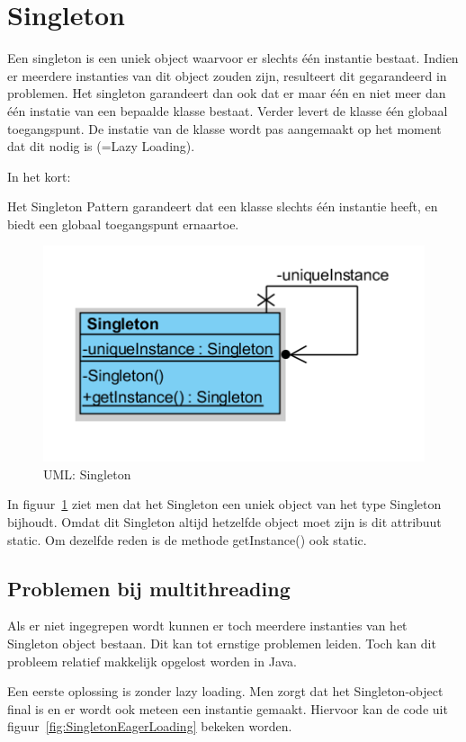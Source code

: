 \documentclass[a4paper,12pt]{article}
\begin{document}
\section{Singleton}
Een singleton is een uniek object waarvoor er slechts één instantie bestaat.
Indien er meerdere instanties van dit object zouden zijn, resulteert dit gegarandeerd in problemen.
Het singleton garandeert dan ook dat er maar één en niet meer dan één instatie van een bepaalde klasse bestaat.
Verder levert de klasse één globaal toegangspunt.
De instatie van de klasse wordt pas aangemaakt op het moment dat dit nodig is (=Lazy Loading).

In het kort:

Het Singleton Pattern garandeert dat een klasse slechts één
instantie heeft, en biedt een globaal toegangspunt ernaartoe.

\begin{figure}[H]
\centering
  	\includegraphics[width=.7\linewidth]{img/Singleton/Singleton.png}
  	\caption{UML: Singleton}
  	\label{fig:Singleton}
\end{figure}

In figuur~\ref{fig:Singleton} ziet men dat het Singleton een uniek object van het type Singleton bijhoudt. Omdat dit Singleton altijd hetzelfde object moet zijn is dit attribuut static. Om dezelfde reden is de methode getInstance() ook static.

\subsection{Problemen bij multithreading}
Als er niet ingegrepen wordt kunnen er toch meerdere instanties van het Singleton object bestaan.
Dit kan tot ernstige problemen leiden.
Toch kan dit probleem relatief makkelijk opgelost worden in Java.

Een eerste oplossing is zonder lazy loading. Men zorgt dat het Singleton-object final is en er wordt ook meteen een instantie gemaakt. Hiervoor kan de code uit figuur~\ref{fig:SingletonEagerLoading} bekeken worden.
\end{document}
